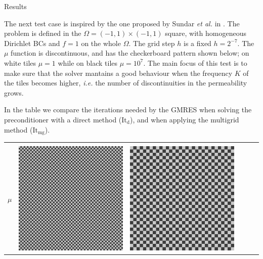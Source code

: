 \documentclass[final]{beamer}
\newlength{\onecolwid}
\begin{document}
\begin{frame}[t]
\begin{columns}[t]
\begin{column}{\onecolwid}
\begin{block}{Results}
\null

The next test case is inspired by the one proposed by Sundar \textit{et al.} in \cite{burstedde2012}.
The problem is defined in the {$\Omega = (-1, 1) \times (-1, 1)$} square,
with homogeneous Dirichlet BCs and $f = 1$ on the whole $\Omega$.
The grid step $h$ is a fixed $h = 2^{-7}$.
The $\mu$ function is discontinuous, and has the checkerboard pattern shown below;
on white tiles $\mu = 1$ while on black tiles $\mu = 10^{7}$.
The main focus of this test is to make sure that the solver mantains a good behaviour when the frequency $K$
of the tiles
becomes higher, \textit{i.e.} the number of discontinuities in the permeability grows.

In the table we compare the iterations needed by the GMRES when solving the preconditioner with a
direct method ($\text{It}_{\text{d}}$), and when applying the multigrid method ($\text{It}_{\text{mg}}$).
\begin{table}
\small
\begin{center}
    \begin{tabular}{cccccc}
        \toprule
        & & & & &\\[-2ex] %
        $\mu$  &
    \includegraphics[scale=0.5]{images/burst_6.png}
        &
    \includegraphics[scale=0.5]{images/burst_5.png}

\end{tabular}
\end{center}
\end{table}
\end{block}
\end{column}
\end{columns}
\end{frame}
\end{document}
